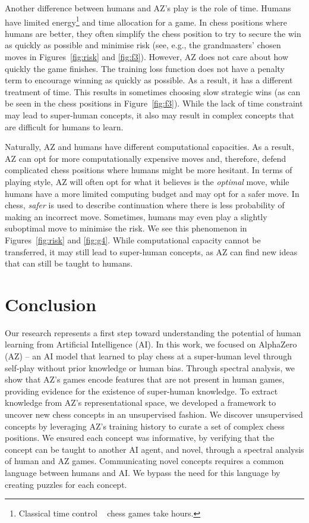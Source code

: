 \documentclass{article}
\begin{document}
Another difference between humans and AZ's play is the role of time. 
Humans have limited energy\footnote{Classical time control ~\citep[see match time controls in][]{fide_handbook} chess games take hours.} and time allocation for a game.
In chess positions where humans are better, they often simplify the chess position to try to secure the win as quickly as possible and minimise risk (see, e.g., the grandmasters' chosen moves in Figures~\ref{fig:risk} and \ref{fig:f3}). 
However, AZ does not care about how quickly the game finishes. The training loss function does not have a penalty term to encourage winning as quickly as possible. As a result, it has a different treatment of time. This results in sometimes choosing slow strategic wins (as can be seen in the chess positions in Figure~\ref{fig:f3}). 
While the lack of time constraint may lead to super-human concepts, it also may result in 
complex concepts that are difficult for humans to learn.  

Naturally, AZ and humans have different computational capacities. As a result, AZ can opt for more computationally expensive moves and, therefore, defend complicated chess positions where humans might be more hesitant. 
In terms of playing style, AZ will often opt for what it believes is the \textit{optimal} move, while humans have a more limited computing budget and may opt for a safer move. In chess, \textit{safer} is used to describe continuation where there is less probability of making an incorrect move. Sometimes, humans may even play a slightly suboptimal move to minimise the risk. We see this phenomenon in Figures~\ref{fig:risk} and \ref{fig:g4}. 
While computational capacity cannot be transferred, it may still lead to super-human concepts, as AZ can find new ideas that can still be taught to humans. 
 

\section{Conclusion} \label{sec:conclusion}
Our research represents a first step toward understanding the potential of human learning from Artificial Intelligence (AI). In this work, we focused on AlphaZero (AZ) -- an AI model that learned to play chess at a super-human level through self-play without prior knowledge or human bias. 
Through spectral analysis, we show that AZ's games encode features that are not present in human games, providing evidence for the existence of super-human knowledge.
To extract knowledge from AZ's representational space, we developed a framework to uncover new chess concepts in an unsupervised fashion.
We discover unsupervised concepts by leveraging AZ's training history to curate a set of complex chess positions.
We ensured each concept was informative, by verifying that the concept can be taught to another AI agent, and novel, through a spectral analysis of human and AZ games.
Communicating novel concepts requires a
common language between humans and AI. We bypass the need for this language by creating puzzles for each concept.
\end{document}
